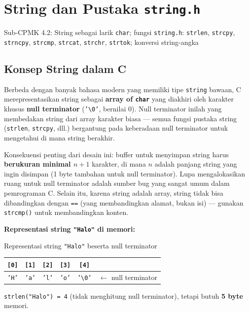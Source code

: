 \documentclass[../main.tex]{subfiles}
\begin{document}
\chapter{String dan Pustaka \texttt{string.h}}

\begin{subcpmk}
  \item Sub-CPMK 4.2: String sebagai larik \texttt{char}; fungsi \texttt{string.h}: \texttt{strlen}, \texttt{strcpy}, \texttt{strncpy}, \texttt{strcmp}, \texttt{strcat}, \texttt{strchr}, \texttt{strtok}; konversi string-angka
\end{subcpmk}


\section{Konsep String dalam C}

Berbeda dengan banyak bahasa modern yang memiliki tipe \texttt{string} bawaan, C merepresentasikan string sebagai \textbf{array of \texttt{char}} yang diakhiri oleh karakter khusus \textbf{null terminator} (\texttt{'\textbackslash 0'}, bernilai 0). Null terminator inilah yang membedakan string dari array karakter biasa --- semua fungsi pustaka string (\texttt{strlen}, \texttt{strcpy}, dll.) bergantung pada keberadaan null terminator untuk mengetahui di mana string berakhir.

Konsekuensi penting dari desain ini: buffer untuk menyimpan string harus \textbf{berukuran minimal $n+1$} karakter, di mana $n$ adalah panjang string yang ingin disimpan (1 byte tambahan untuk null terminator). Lupa mengalokasikan ruang untuk null terminator adalah sumber bug yang sangat umum dalam pemrograman C. Selain itu, karena string adalah array, string tidak bisa dibandingkan dengan \texttt{==} (yang membandingkan alamat, bukan isi) --- gunakan \texttt{strcmp()} untuk membandingkan konten.

\begin{konsep}
\textbf{Representasi string \texttt{"Halo"} di memori:}

\begin{modultable}[]{Representasi string \texttt{"Halo"} beserta null terminator}
\begin{tabular}{|c|c|c|c|c|c|}
\hline
\texttt{[0]} & \texttt{[1]} & \texttt{[2]} & \texttt{[3]} & \texttt{[4]} & \\
\hline
\texttt{'H'} & \texttt{'a'} & \texttt{'l'} & \texttt{'o'} & \texttt{'\textbackslash 0'} & $\leftarrow$ null terminator \\
\hline
\end{tabular}
\end{modultable}

\texttt{strlen("Halo") = 4} (tidak menghitung null terminator), tetapi butuh \textbf{5 byte} memori.
\end{konsep}
\end{document}
